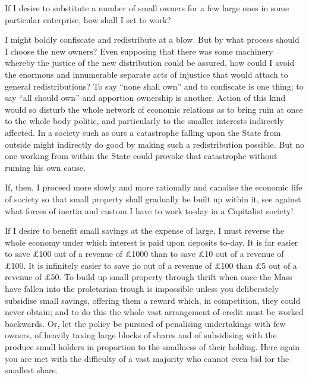 \documentclass{book}
\begin{document}
If I desire to substitute a number of small owners for a few large ones in some particular enterprise, how shall I set to work?

I might boldly confiscate and redistribute at a blow. But by what process should I choose the new owners? Even supposing that there was some machinery whereby the justice of the new distribution could be assured, how could I avoid the enormous and innumerable separate acts of injustice that would attach to general redistributions? To say “none shall own” and to confiscate is one thing; to say “all should own” and apportion ownership is another. Action of this kind would so disturb the whole network of economic relations as to bring ruin at once to the whole body politic, and particularly to the smaller interests indirectly affected. In a society such as ours a catastrophe falling upon the State from outside might indirectly do good by making such a redistribution possible. But no one working from within the State could provoke that catastrophe without ruining his own cause.

If, then, I proceed more slowly and more rationally and canalise the economic life of society so that small property shall gradually be built up within it, see against what forces of inertia and custom I have to work to-day in a Capitalist society!

If I desire to benefit small savings at the expense of large, I must reverse the whole economy under which interest is paid upon deposits to-day. It is far easier to save £100 out of a revenue of £1000 than to save £10 out of a revenue of £100. It is infinitely easier to save ;io out of a revenue of £100 than £5 out of a revenue of £50. To build up small property through thrift when once the Mass have fallen into the proletarian trough is impossible unless you deliberately subsidise small savings, offering them a reward which, in competition, they could never obtain; and to do this the whole vast arrangement of credit must be worked backwards. Or, let the policy be pursued of penalising undertakings with few owners, of heavily taxing large blocks of shares and of subsidising with the produce small holders in proportion to the smallness of their holding. Here again you are met with the difficulty of a vast majority who cannot even bid for the smallest share.
\end{document}
